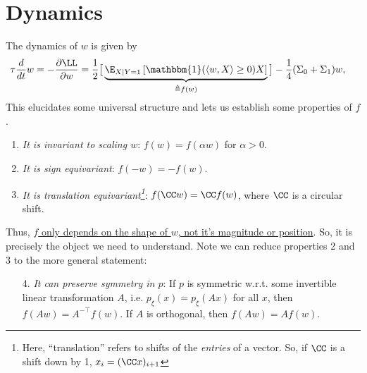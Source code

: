 \documentclass{article}
\begin{document}
\section{Dynamics}
The dynamics of $w$ is given by
\begin{align}
  \tau \frac{d}{dt} w
  &= - \frac{\partial \LL}{\partial w}
  = \frac{1}{2} \big[ \underbrace{ \E_{ X \mid Y = 1 } \left[ \mathbbm{1}(\langle w, X \rangle \geq 0) X \right] }_{\triangleq f(w)} \big] - \frac{1}{4} ( \Sigma_0 + \Sigma_1 ) w,
  \label{eq:dwdt}
\end{align}
This elucidates some universal structure
and lets us establish some properties of $f$.
\begin{enumerate}
  \item \emph{It is invariant to scaling $w$}: $f(w) = f(\alpha w)$ for $\alpha > 0$.
  \item \emph{It is sign equivariant}: $f(-w) = -f(w)$.
  \item \emph{It is translation equivariant\footnote{Here, ``translation'' refers to shifts of the \emph{entries} of a vector. So, if $\CC$ is a shift down by 1, $x_i = (\CC x)_{i+1}$}}: $f(\CC w) = \CC f(w)$, where $\CC$ is a circular shift.
\end{enumerate}
Thus, \underline{$f$ only depends on the shape of $w$, not it's magnitude or position}.
So, it is precisely the object we need to understand.
Note we can reduce properties 2 and 3 to the more general statement:
\begin{enumerate}
  \item[4.] \emph{It can preserve symmetry in $p$}: If $p$ is symmetric w.r.t. some invertible linear  transformation $A$, i.e. $p_{\xi}(x) = p_{\xi}(A x)$ for all $x$, then $f(A w) = A^{-\top} f(w)$.
  If $A$ is orthogonal, then $f(A w) = A f(w)$.
\end{enumerate}

\end{document}

